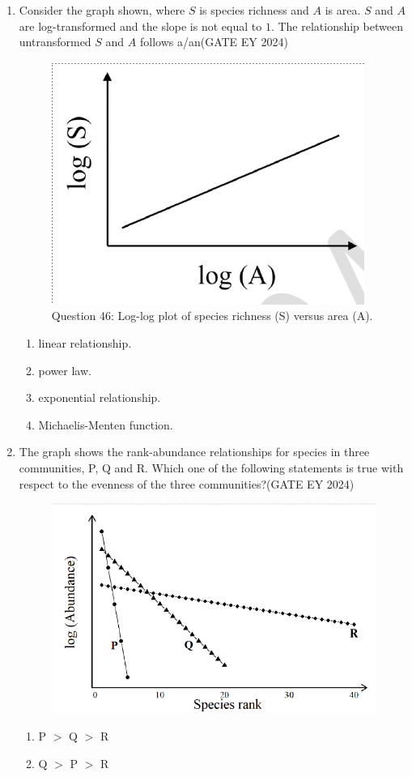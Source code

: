 \begin{enumerate}
\item Consider the graph shown, where $S$ is species richness and $A$ is area. $S$ and $A$ are log-transformed and the slope is not equal to $1$. The relationship between untransformed $S$ and $A$ follows a/an\hfill{(GATE EY 2024)}
\begin{figure}[!ht]
    \centering
    \includegraphics[width=0.3\columnwidth]{figs/Q-46.png}
    \caption{Question 46: Log-log plot of species richness (S) versus area (A).}
    \label{Q.46}
\end{figure}
    \begin{enumerate}
        \item linear relationship.
        \item power law.
        \item exponential relationship.
        \item Michaelis-Menten function.
    \end{enumerate}
\item The graph shows the rank-abundance relationships for species in three communities, P, Q and R. Which one of the following statements is true with respect to the evenness of the three communities?\hfill{(GATE EY 2024)}
\begin{figure}[!ht]
    \centering
    \includegraphics[width=0.8\columnwidth]{figs/Q-47.png}
    \label{Q.47}
\end{figure}
    \begin{enumerate}
        \item P $>$ Q $>$ R
        \item Q $>$ P $>$ R

\end{enumerate}
\end{enumerate}
